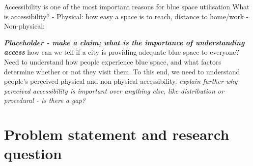 \documentclass{article}
\newcommand{\bisection}[1]{\textbf{\textit{#1}}}
\begin{document}

Accessibility is one of the most important reasons for blue space utilisation \parencite{wang2015physical}
What is accessibility? 
- Physical: how easy a space is to reach, distance to home/work
- Non-physical:

\bisection{Placeholder - make a claim; what is the importance of understanding access} how can we tell if a city is providing adequate blue space to everyone? Need to understand how people experience blue space, and what factors determine whether or not they visit them. To this end, we need to understand people's perceived physical and non-physical accessibility. 
\textit{explain further why perceived accessibility is important over anything else, like distribution or procedural - is there a gap?}






\section{Problem statement and research question}
\end{document}
